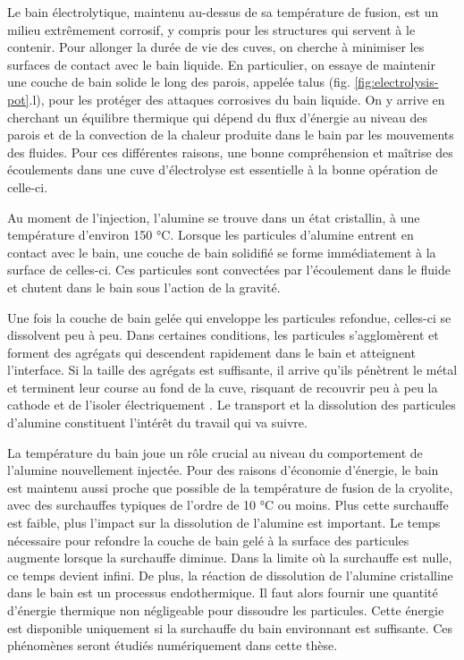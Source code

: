 Le bain électrolytique, maintenu au-dessus de sa température de
fusion, est un milieu extrêmement corrosif, y compris pour les
structures qui servent à le contenir. Pour allonger la durée de vie
des cuves, on cherche à minimiser les surfaces de contact avec le bain
liquide. En particulier, on essaye de maintenir une couche de bain
solide le long des parois, appelée talus
(fig. \ref{fig:electrolysis-pot}.l), pour les protéger des attaques
corrosives du bain liquide. On y arrive en cherchant un équilibre
thermique qui dépend du flux d'énergie au niveau des parois et de la
convection de la chaleur produite dans le bain par les mouvements des
fluides. Pour ces différentes raisons, une bonne compréhension et
maîtrise des écoulements dans une cuve d'électrolyse est essentielle à
la bonne opération de celle-ci.

Au moment de l'injection, l'alumine se trouve dans un état cristallin,
à une température d'environ \num{150} \si{\celsius}. Lorsque les
particules d'alumine entrent en contact avec le bain, une couche de
bain solidifié se forme immédiatement à la surface de celles-ci. Ces particules
sont convectées par l'écoulement dans le fluide et chutent dans le bain
sous l'action de la gravité.

Une fois la couche de bain gelée qui enveloppe les particules
refondue, celles-ci se dissolvent peu à peu. Dans certaines
conditions, les particules s'agglomèrent et forment des agrégats
qui descendent rapidement dans le bain et atteignent l'interface. Si
la taille des agrégats est suffisante, il arrive qu'ils pénètrent
le métal et terminent leur course au fond de la cuve, risquant de
recouvrir peu à peu la cathode et de l'isoler électriquement
\cite{Geay2016}. Le transport et la dissolution des particules
d'alumine constituent l'intérêt du travail qui va suivre.

La température du bain joue un rôle crucial au niveau du comportement
de l'alumine nouvellement injectée. Pour des raisons d'économie
d'énergie, le bain est maintenu aussi proche que possible de la
température de fusion de la cryolite, avec des surchauffes typiques de
l'ordre de \num{10} \si{\celsius} ou moins. Plus cette surchauffe est
faible, plus l'impact sur la dissolution de l'alumine est
important. Le temps nécessaire pour refondre la couche de bain gelé à
la surface des particules augmente lorsque la surchauffe diminue. Dans
la limite où la surchauffe est nulle, ce temps devient infini. De
plus, la réaction de dissolution de l'alumine cristalline dans le bain
est un processus endothermique. Il faut alors fournir une quantité
d'énergie thermique non négligeable pour dissoudre les
particules. Cette énergie est disponible uniquement si la surchauffe
du bain environnant est suffisante. Ces phénomènes seront
étudiés numériquement dans cette thèse.

